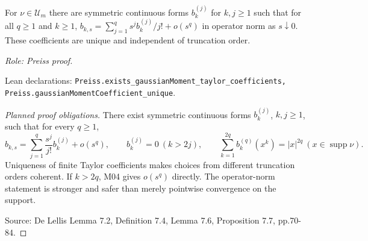 \begin{lemma}
\label{lem:taylor-two}







For $\nu\in\mathcal U_m$ there are symmetric continuous forms $b_k^{(j)}$ for $k,j\geq1$ such that for all $q\geq1$ and $k\geq1$, $b_{k,s}=\sum_{j=1}^q s^j b_k^{(j)}/j!+o(s^q)$ in operator norm as $s\downarrow0$. These coefficients are unique and independent of truncation order.
\par\emph{Role: Preiss proof.}
\par Lean declarations: \texttt{Preiss.exists\_gaussianMoment\_taylor\_coefficients, Preiss.gaussianMomentCoefficient\_unique}.
\end{lemma}
\begin{proof}[Planned proof obligations]

There exist symmetric continuous forms $b_k^{(j)}$, $k,j\geq1$, such that for
every $q\geq1$,
\[
 b_{k,s}=\sum_{j=1}^{q}\frac{s^j}{j!}b_k^{(j)}+o(s^q),\qquad
 b_k^{(j)}=0\ (k>2j),\qquad
 \sum_{k=1}^{2q}b_k^{(q)}(x^k)=|x|^{2q}\ (x\in\operatorname{supp}\nu).
\]
Uniqueness of finite Taylor coefficients makes choices from different truncation
orders coherent. If $k>2q$, M04 gives $o(s^q)$ directly. The operator-norm
statement is stronger and safer than merely pointwise convergence on the support.
\par Source: De Lellis Lemma 7.2, Definition 7.4, Lemma 7.6, Proposition 7.7, pp.70-84.
\end{proof}

